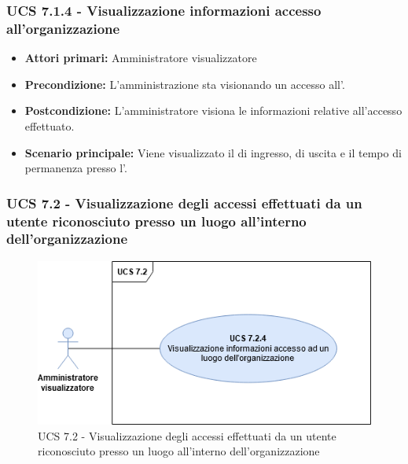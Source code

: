 \subsubsection{UCS 7.1.4 - Visualizzazione informazioni accesso all'organizzazione}
\begin{itemize}
	\item \textbf{Attori primari:} Amministratore visualizzatore
	\item \textbf{Precondizione:} L'amministrazione sta visionando un accesso all'.
	\item \textbf{Postcondizione:} L'amministratore visiona le informazioni relative all'accesso effettuato.
	\item \textbf{Scenario principale:} Viene visualizzato il  di ingresso, di uscita e il tempo di permanenza presso l'.
\end{itemize}

\subsubsection{UCS 7.2 - Visualizzazione degli accessi effettuati da un utente riconosciuto presso un luogo all'interno dell'organizzazione}

\begin{figure}[h]
	\centering
	\includegraphics[scale=0.5]{Sezioni/UseCase/Immagini/UCS7.2.png}
	\caption{UCS 7.2 - Visualizzazione degli accessi effettuati da un utente riconosciuto presso un luogo all'interno dell'organizzazione}
\end{figure}

